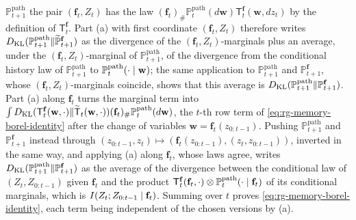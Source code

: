 $\mathbb P^{\mathrm{path}}_{t+1}$ the pair $(\mathbf f_t,Z_t)$ has the law
$(\mathbf f_t)_\#\mathbb P^{\mathrm{path}}_t(d\mathbf w)\mathsf T^{\mathbf f}_t(\mathbf
w,dz_t)$ by the definition of $\mathsf T^{\mathbf f}_t$. Part (a) with first coordinate
$(\mathbf f_t,Z_t)$ therefore writes
$D_{\mathrm{KL}}(\mathbb P^{\mathrm{path}}_{t+1}\Vert\widetilde{\mathbb P}^{\mathbf f}_{t+1})$ as
the divergence of the $(\mathbf f_t,Z_t)$-marginals plus an average, under the
$(\mathbf f_t,Z_t)$-marginal of $\mathbb P^{\mathrm{path}}_{t+1}$, of the divergence
from the conditional history law of $\mathbb P^{\mathrm{path}}_{t+1}$ to
$\mathbb P^{\mathrm{path}}_t(\cdot\mid\mathbf w)$; the same application to
$\mathbb P^{\mathrm{path}}_{t+1}$ and $\mathbb P^{\mathbf f}_{t+1}$, whose
$(\mathbf f_t,Z_t)$-marginals coincide, shows that this average is
$D_{\mathrm{KL}}(\mathbb P^{\mathrm{path}}_{t+1}\Vert\mathbb P^{\mathbf f}_{t+1})$. Part (a) along
$\mathbf f_t$ turns the marginal term into
$\int D_{\mathrm{KL}}(\mathsf T^{\mathbf f}_t(\mathbf w,\cdot)\Vert\widetilde{\mathsf T}_t(\mathbf
w,\cdot))(\mathbf f_t)_\#\mathbb P^{\mathrm{path}}_t(d\mathbf w)$, the $t$-th row term
of \eqref{eq:rg-memory-borel-identity} after the change of variables
$\mathbf w=\mathbf f_t(z_{0:t-1})$. Pushing $\mathbb P^{\mathrm{path}}_{t+1}$ and
$\mathbb P^{\mathbf f}_{t+1}$ instead through
$(z_{0:t-1},z_t)\mapsto(\mathbf f_t(z_{0:t-1}),(z_t,z_{0:t-1}))$, inverted in the same
way, and applying (a) along $\mathbf f_t$, whose laws agree, writes
$D_{\mathrm{KL}}(\mathbb P^{\mathrm{path}}_{t+1}\Vert\mathbb P^{\mathbf f}_{t+1})$ as the average
of the divergence between the conditional law of $(Z_t,Z_{0:t-1})$ given $\mathbf f_t$
and the product
$\mathsf T^{\mathbf f}_t(\mathbf f_t,\cdot)\otimes\mathbb P^{\mathrm{path}}_t(\cdot\mid\mathbf
f_t)$ of its conditional marginals, which is
$I(Z_t;Z_{0:t-1}\mid\mathbf f_t)$. Summing over $t$ proves
\eqref{eq:rg-memory-borel-identity}, each term being independent of the chosen versions
by (a).

